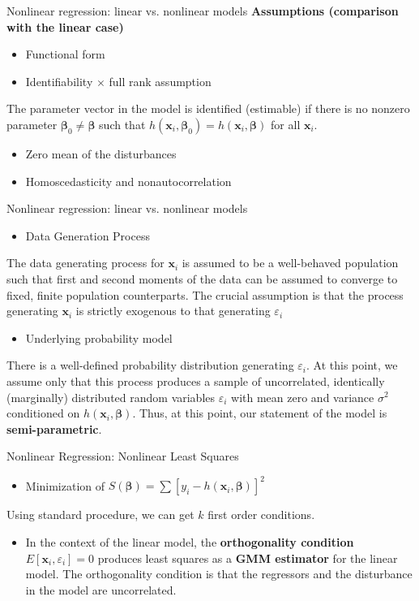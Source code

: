 \documentclass{beamer}
\begin{document}
\begin{frame}{Nonlinear regression: linear vs. nonlinear models}
\textbf{Assumptions (comparison with the linear case)}
\begin{itemize}
\item Functional form
\item Identifiability $\times$ full rank assumption
\end{itemize}
The parameter vector in the model is identified (estimable) if there is no nonzero parameter $\bm{\beta}_0 \neq \bm{\beta}$ such that $h(\bm{x}_i, \bm{\beta}_0)=h(\bm{x}_i, \bm{\beta})$ for all $\bm{x}_i$.
\begin{itemize}
\item Zero mean of the disturbances
\item Homoscedasticity and nonautocorrelation
\end{itemize}
\end{frame}
\begin{frame}{Nonlinear regression: linear vs. nonlinear models}
\begin{itemize}
\item Data Generation Process
\end{itemize}
The data generating process for $\bm{x}_i$ is assumed to be a well-behaved population such that first and second moments of the data can be assumed to converge to fixed, finite population counterparts. The crucial assumption is that the process generating $\bm{x}_i$ is strictly exogenous to that generating $\varepsilon_i$
\begin{itemize}
\item Underlying probability model
\end{itemize}
There is a well-defined probability distribution generating $\varepsilon_i$. At this point, we assume only that this process produces a sample of uncorrelated, identically (marginally) distributed random variables $\varepsilon_i$ with mean zero and variance $\sigma^2$ conditioned on $h(\bm{x}_i, \bm{\beta})$. Thus, at this point, our statement of the model is \textbf{semi-parametric}.
\end{frame}
\begin{frame}{Nonlinear Regression: Nonlinear Least Squares}
\begin{itemize}
\item Minimization of \qquad $S(\bm{\beta})=\sum[y_i-h(\bm{x}_i, \bm{\beta})]^2$
\medskip
\end{itemize}
Using standard procedure, we can get $k$ first order conditions.
\smallskip
\begin{itemize}
\item In the context of the linear model, the \textbf{orthogonality condition} $E[\bm{x}_i, \varepsilon_i]=0$ produces least squares as a \textbf{GMM estimator} for the linear model. The orthogonality condition is that the regressors and the disturbance in the model are uncorrelated.
\end{itemize}
\end{frame}
\end{document}
